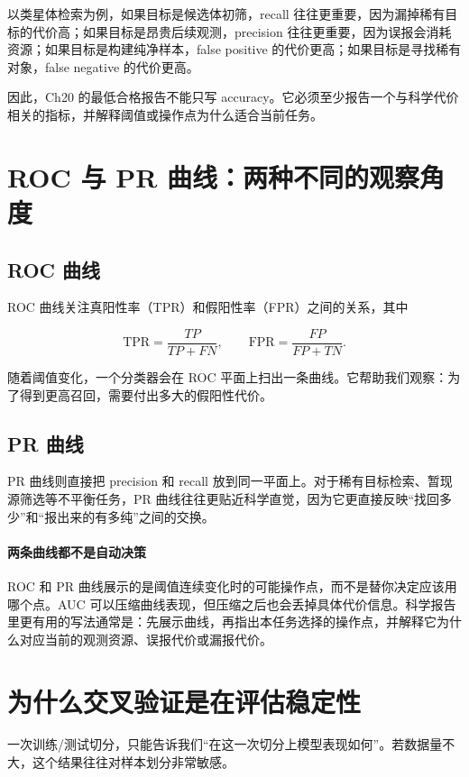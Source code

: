 以类星体检索为例，如果目标是候选体初筛，recall 往往更重要，因为漏掉稀有目标的代价高；如果目标是昂贵后续观测，precision 往往更重要，因为误报会消耗资源；如果目标是构建纯净样本，false positive 的代价更高；如果目标是寻找稀有对象，false negative 的代价更高。

因此，Ch20 的最低合格报告不能只写 accuracy。它必须至少报告一个与科学代价相关的指标，并解释阈值或操作点为什么适合当前任务。

\section{ROC 与 PR 曲线：两种不同的观察角度}

\subsection{ROC 曲线}

ROC 曲线关注真阳性率（TPR）和假阳性率（FPR）之间的关系，其中

\[
\mathrm{TPR} = \frac{TP}{TP + FN},
\qquad
\mathrm{FPR} = \frac{FP}{FP + TN}.
\]

随着阈值变化，一个分类器会在 ROC 平面上扫出一条曲线。它帮助我们观察：为了得到更高召回，需要付出多大的假阳性代价。

\subsection{PR 曲线}

PR 曲线则直接把 precision 和 recall 放到同一平面上。对于稀有目标检索、暂现源筛选等不平衡任务，PR 曲线往往更贴近科学直觉，因为它更直接反映“找回多少”和“报出来的有多纯”之间的交换。

\paragraph{两条曲线都不是自动决策}

ROC 和 PR 曲线展示的是阈值连续变化时的可能操作点，而不是替你决定应该用哪个点。AUC 可以压缩曲线表现，但压缩之后也会丢掉具体代价信息。科学报告里更有用的写法通常是：先展示曲线，再指出本任务选择的操作点，并解释它为什么对应当前的观测资源、误报代价或漏报代价。

\section{为什么交叉验证是在评估稳定性}

一次训练/测试切分，只能告诉我们“在这一次切分上模型表现如何”。若数据量不大，这个结果往往对样本划分非常敏感。

